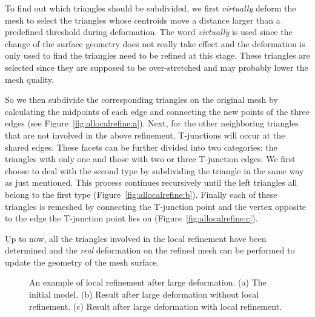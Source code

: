 To find out which triangles should be subdivided, we first \textit{virtually} deform the mesh to select the triangles whose centroids move a distance larger than a predefined threshold during deformation. The word \textit{virtually} is used since the change of the surface geometry does not really take effect and the deformation is only used to find the triangles need to be refined at this stage. These triangles are selected since they are supposed to be over-stretched and may probably lower the mesh quality.

So we then subdivide the corresponding triangles on the original mesh by calculating the midpoints of each edge and connecting the new points of the three edges (see Figure~\ref{fig:allocalrefine:a}). Next, for the other neighboring triangles that are not involved in the above refinement, T-junctions will occur at the shared edges. These facets can be further divided into two categories: the triangles with only one and those with two or three T-junction edges. We first choose to deal with the second type by subdividing the triangle in the same way as just mentioned. This process continues recursively until the left triangles all belong to the first type (Figure~\ref{fig:allocalrefine:b}). Finally each of these triangles is remeshed by connecting the T-junction point and the vertex opposite to the edge the T-junction point lies on (Figure~\ref{fig:allocalrefine:c}).

Up to now, all the triangles involved in the local refinement have been determined and the \textit{real} deformation on the refined mesh can be performed to update the geometry of the mesh surface.

\begin{figure} [htbp]
  \caption{An example of local refinement after large deformation. (a) The initial model. (b) Result after large deformation without local refinement. (c) Result after large deformation with local refinement.}
  \label{fig:localrefineEG} %
\end{figure}

